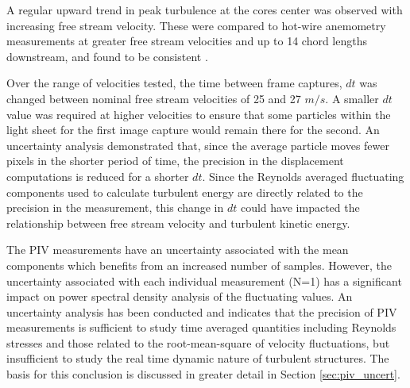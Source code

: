 










\makeatletter
{}
\makeatother

A regular upward trend in peak turbulence at the cores center was observed with 
increasing free stream velocity. These were compared to hot-wire anemometry 
measurements at greater free stream velocities and up to 
14 chord lengths downstream, and found to be consistent \cite{thompson2016}.

Over the range of velocities tested, the time between frame captures, $dt$ was 
changed between nominal free stream velocities of 25 and 27 $m/s$. A smaller 
$dt$ value was required at higher velocities to ensure that some particles 
within the light sheet for the first image capture would remain there for the 
second. An uncertainty analysis demonstrated that, since the average particle 
moves fewer pixels in the shorter period of time, the precision in the 
displacement computations is reduced for a shorter $dt$. Since the Reynolds 
averaged fluctuating components used to calculate turbulent energy are directly 
related to the precision in the measurement, this change in $dt$ could have 
impacted the relationship between free stream velocity and turbulent kinetic 
energy.

The PIV measurements have an uncertainty associated with the mean components 
which benefits from an increased number of samples. However, the 
uncertainty associated with each individual measurement (N=1) has a 
significant impact on power spectral density analysis of the fluctuating 
values. An uncertainty analysis has been conducted and indicates that the 
precision of PIV measurements is sufficient to study time averaged quantities 
including Reynolds stresses and those related to the root-mean-square of 
velocity fluctuations, but insufficient to study the real time dynamic nature 
of turbulent structures. The basis for this conclusion is discussed in greater 
detail in Section \ref{sec:piv_uncert}.

